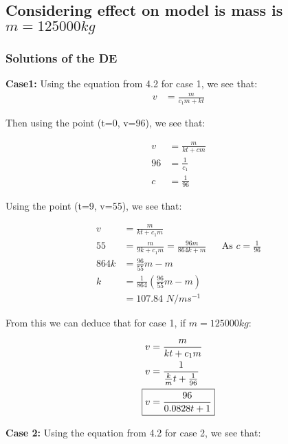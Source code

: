 \subsection{Considering effect on model is mass is $m=125000kg$}

\subsubsection{Solutions of the DE}
\textbf{Case1: }
Using the equation from 4.2 for case 1, we see that:
\begin{align*}
    v &= \frac{m}{c_{1}m+kt}
\end{align*}

Then using the point (t=0, v=96), we see that:
\begin{center}
\begin{align*}
    v &= \frac{m}{kt+cm}
    \\ 96 &= \frac{1}{c_1}
    \\ c &= \frac{1}{96}
\end{align*}
\end{center}
Using the point (t=9, v=55), we see that:
\begin{center}
\begin{align*}
    v &= \frac{m}{kt+c_1m}
    \\ 55 &= \frac{m}{9k + c_1m} = \frac{96m}{864k + m} && \text{As $c=\frac{1}{96}$}
    \\ 864k &= \frac{96}{55}m - m
    \\ k &= \frac{1}{864}(\frac{96}{55}m - m)
    \\ &= \text{107.84 $N/ms^{-1}$}
\end{align*}
\end{center}
From this we can deduce that for case 1, if $m=125000kg$:
\begin{center}
\begin{align*}
    v &= \frac{m}{kt+c_{1}m}
    \\ v &= \frac{1}{\frac{k}{m}t+\frac{1}{96}}
    \\ \Aboxed{v &= \frac{96}{0.0828t + 1}}
\end{align*}
\end{center}

\textbf{Case 2: } 
Using the equation from 4.2 for case 2, we see that:

